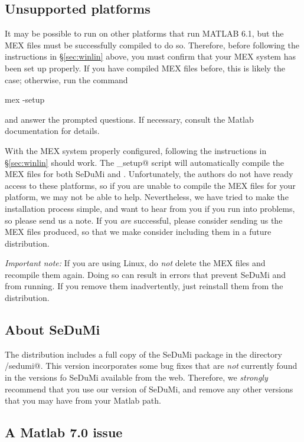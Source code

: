\documentclass[12pt]{article}
\begin{document}
\subsection{Unsupported platforms}
\label{sec:othersys}

It may be possible to run \cvx on other platforms that run MATLAB 6.1, 
but the MEX files must be successfully compiled to do so. Therefore, before
following the instructions in \S\ref{sec:winlin} above, you must
confirm that your MEX system has been set up properly. If you have compiled
MEX files before, this is likely the case; otherwise, run the command
\begin{code}
	mex -setup
\end{code}
and answer the prompted questions. If necessary, consult the Matlab documentation for details.

With the MEX system properly configured, following the instructions in
\S\ref{sec:winlin} should work. The \verb@cvx_setup@ script will automatically
compile the MEX files for both SeDuMi and \cvx. Unfortunately, the authors do not have ready access to these platforms, so if you
are unable to compile the MEX files for your platform, we may not be able to help.
Nevertheless, we have tried to make the installation process simple, and 
want to hear from you if you run into problems, so please send us a note. If
you \emph{are} successful, please consider sending us the MEX files produced,
so that we make consider including them in a future \cvx distribution.

\emph{Important note:} If you are using Linux,
do \emph{not} delete the MEX files and recompile them again.
Doing so can result in  errors that prevent SeDuMi and \cvx from running.
If you remove them inadvertently, just reinstall them from the distribution.

\subsection{About SeDuMi}

The \cvx distribution includes a full copy of the SeDuMi package
in the directory \verb@cvx/sedumi@. This version incorporates 
some bug fixes that are \emph{not} currently found in the versions fo SeDuMi
available from the web. Therefore, we \emph{strongly} recommend that
you use our version of SeDuMi, and remove any other versions that 
you may have from your Matlab path.

\subsection{A Matlab 7.0 issue}
\label{sec:sevenprob}
\end{document}
